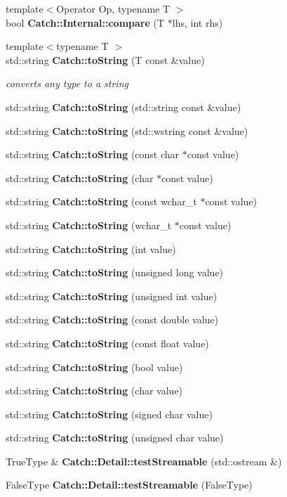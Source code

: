 \begin{DoxyCompactItemize}
\item 
{\footnotesize template$<$Operator Op, typename T $>$ }\\bool \textbf{ Catch\+::\+Internal\+::compare} (T $\ast$lhs, int rhs)
\item 
{\footnotesize template$<$typename T $>$ }\\std\+::string \textbf{ Catch\+::to\+String} (T const  \&value)
\begin{DoxyCompactList}\small\item\em converts any type to a string \end{DoxyCompactList}\item 
std\+::string \textbf{ Catch\+::to\+String} (std\+::string const \&value)
\item 
std\+::string \textbf{ Catch\+::to\+String} (std\+::wstring const \&value)
\item 
std\+::string \textbf{ Catch\+::to\+String} (const char $\ast$const value)
\item 
std\+::string \textbf{ Catch\+::to\+String} (char $\ast$const value)
\item 
std\+::string \textbf{ Catch\+::to\+String} (const wchar\+\_\+t $\ast$const value)
\item 
std\+::string \textbf{ Catch\+::to\+String} (wchar\+\_\+t $\ast$const value)
\item 
std\+::string \textbf{ Catch\+::to\+String} (int value)
\item 
std\+::string \textbf{ Catch\+::to\+String} (unsigned long value)
\item 
std\+::string \textbf{ Catch\+::to\+String} (unsigned int value)
\item 
std\+::string \textbf{ Catch\+::to\+String} (const double value)
\item 
std\+::string \textbf{ Catch\+::to\+String} (const float value)
\item 
std\+::string \textbf{ Catch\+::to\+String} (bool value)
\item 
std\+::string \textbf{ Catch\+::to\+String} (char value)
\item 
std\+::string \textbf{ Catch\+::to\+String} (signed char value)
\item 
std\+::string \textbf{ Catch\+::to\+String} (unsigned char value)
\item 
True\+Type \& \textbf{ Catch\+::\+Detail\+::test\+Streamable} (std\+::ostream \&)
\item 
False\+Type \textbf{ Catch\+::\+Detail\+::test\+Streamable} (False\+Type)
\item 

\end{DoxyCompactItemize}
